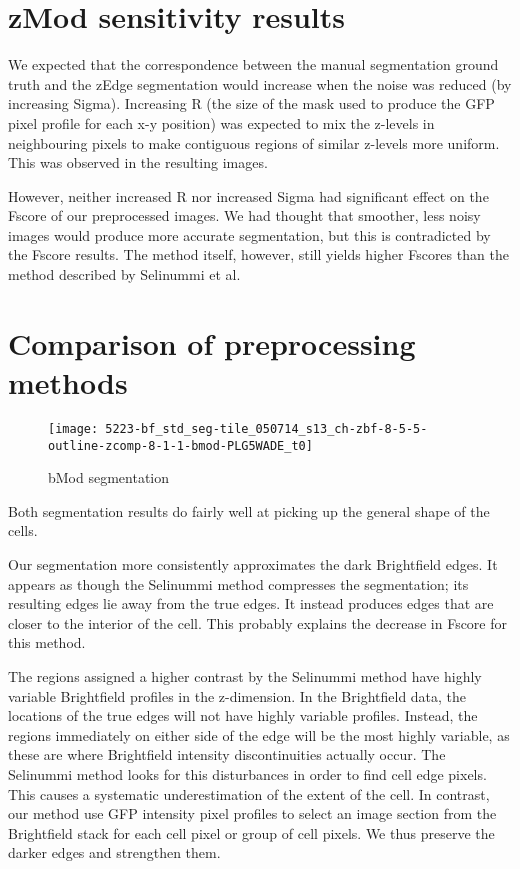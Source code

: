 \section{zMod sensitivity results}

We expected that the correspondence between the manual segmentation ground truth and the zEdge segmentation would increase when the noise was reduced (by increasing Sigma). Increasing R (the size of the mask used to produce the GFP pixel profile for each x-y position) was expected to mix the z-levels in neighbouring pixels to make contiguous regions of similar z-levels more uniform. This was observed in the resulting images.

However, neither increased R nor increased Sigma had significant effect on the Fscore of our preprocessed images. We had thought that smoother, less noisy images would produce more accurate segmentation, but this is contradicted by the Fscore results. The method itself, however, still yields higher Fscores than the method described by Selinummi et al.

\section{Comparison of preprocessing methods}

\begin{figure}[htbp!]
\centering
\texttt{[image: 5223-bf\_std\_seg-tile\_050714\_s13\_ch-zbf-8-5-5-outline-zcomp-8-1-1-bmod-PLG5WADE\_t0]}
\caption{bMod segmentation}
\label{fig:bmod_segmentation}
\end{figure}

Both segmentation results do fairly well at picking up the general shape of the cells.

Our segmentation more consistently approximates the dark Brightfield edges. It appears as though the Selinummi method compresses the segmentation; its resulting edges lie away from the true edges. It instead produces edges that are closer to the interior of the cell. This probably explains the decrease in Fscore for this method.

The regions assigned a higher contrast by the Selinummi method have highly variable Brightfield profiles in the z-dimension. In the Brightfield data, the locations of the true edges will not have highly variable profiles. Instead, the regions immediately on either side of the edge will be the most highly variable, as these are where Brightfield intensity discontinuities actually occur. The Selinummi method looks for this disturbances in order to find cell edge pixels. This causes a systematic underestimation of the extent of the cell. In contrast, our method use GFP intensity pixel profiles to select an image section from the Brightfield stack for each cell pixel or group of cell pixels. We thus preserve the darker edges and strengthen them.
